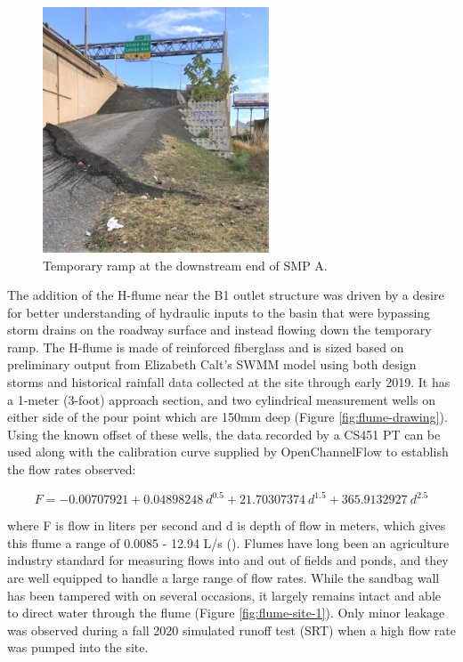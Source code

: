 \begin{figure}[ht!]
	\centering
	\includegraphics[width=0.6\textwidth]{gfx/chapter-instrumentation/temporary-ramp.jpg}
	\caption{Temporary ramp at the downstream end of SMP A.}
	\label{fig:temporary-ramp}
\end{figure}

The addition of the H-flume near the B1 outlet structure was driven by a desire for better understanding of hydraulic inputs to the basin that were bypassing storm drains on the roadway surface and instead flowing down the temporary ramp.
The H-flume is made of reinforced fiberglass and is sized based on preliminary output from Elizabeth Calt's SWMM model using both design storms and historical rainfall data collected at the site through early 2019.
It has a 1-meter (3-foot) approach section, and two cylindrical measurement wells on either side of the pour point which are 150mm deep (Figure \ref{fig:flume-drawing}).
Using the known offset of these wells, the data recorded by a CS451 PT can be used along with the calibration curve supplied by OpenChannelFlow to establish the flow rates observed:

\begin{equation}
	F = -0.00707921 + 0.04898248\ d^{0.5} + 21.70307374\ d^{1.5} + 365.9132927\ d^{2.5}
\end{equation}

where F is flow in liters per second and d is depth of flow in meters, which gives this flume a range of 0.0085 - 12.94 L/s (\cite{OpenChannelFlow2021}).
Flumes have long been an agriculture industry standard for measuring flows into and out of fields and ponds, and they are well equipped to handle a large range of flow rates.
While the sandbag wall has been tampered with on several occasions, it largely remains intact and able to direct water through the flume (Figure \ref{fig:flume-site-1}).
Only minor leakage was observed during a fall 2020 simulated runoff test (SRT) when a high flow rate was pumped into the site.

